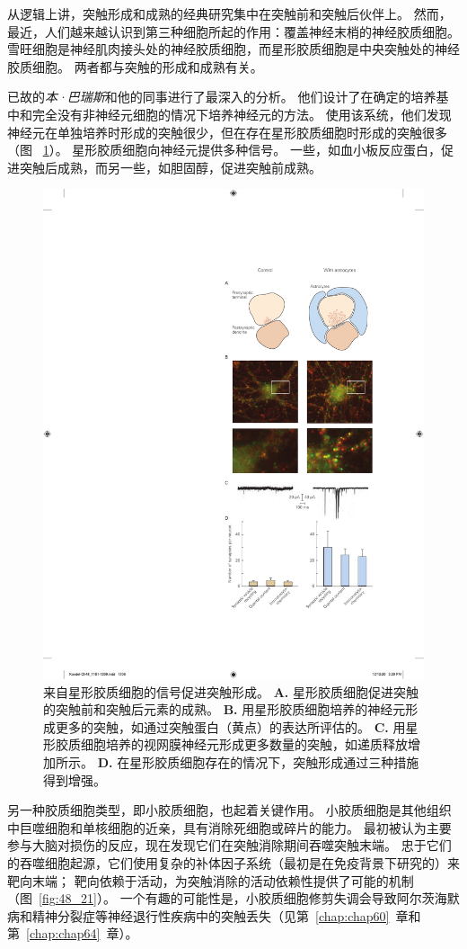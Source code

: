 从逻辑上讲，突触形成和成熟的经典研究集中在突触前和突触后伙伴上。
然而，最近，人们越来越认识到第三种细胞所起的作用：覆盖神经末梢的神经胶质细胞。
雪旺细胞是神经肌肉接头处的神经胶质细胞，而星形胶质细胞是中央突触处的神经胶质细胞。
两者都与突触的形成和成熟有关。


已故的\textit{本·巴瑞斯}和他的同事进行了最深入的分析。
他们设计了在确定的培养基中和完全没有非神经元细胞的情况下培养神经元的方法。
使用该系统，他们发现神经元在单独培养时形成的突触很少，但在存在星形胶质细胞时形成的突触很多（图 ~\ref{fig:48_20}）。
星形胶质细胞向神经元提供多种信号。
一些，如血小板反应蛋白，促进突触后成熟，而另一些，如胆固醇，促进突触前成熟。


\begin{figure}[htbp]
	\centering
	\includegraphics[width=0.5\linewidth]{chap48/fig_48_20}
	\caption{来自星形胶质细胞的信号促进突触形成。
		\textbf{A.} 星形胶质细胞促进突触的突触前和突触后元素的成熟。
		\textbf{B.} 用星形胶质细胞培养的神经元形成更多的突触，如通过突触蛋白（黄点）的表达所评估的。
		\textbf{C.} 用星形胶质细胞培养的视网膜神经元形成更多数量的突触，如递质释放增加所示。
		\textbf{D.} 在星形胶质细胞存在的情况下，突触形成通过三种措施得到增强。}
	\label{fig:48_20}
\end{figure}


另一种胶质细胞类型，即小胶质细胞，也起着关键作用。
小胶质细胞是其他组织中巨噬细胞和单核细胞的近亲，具有消除死细胞或碎片的能力。
最初被认为主要参与大脑对损伤的反应，现在发现它们在突触消除期间吞噬突触末端。
忠于它们的吞噬细胞起源，它们使用复杂的补体因子系统（最初是在免疫背景下研究的）来靶向末端；
靶向依赖于活动，为突触消除的活动依赖性提供了可能的机制（图~\ref{fig:48_21}）。
一个有趣的可能性是，小胶质细胞修剪失调会导致阿尔茨海默病和精神分裂症等神经退行性疾病中的突触丢失（见第~\ref{chap:chap60}~章和第~\ref{chap:chap64}~章）。



